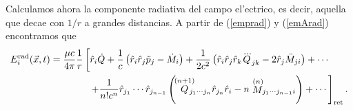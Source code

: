 Calculamos ahora la componente radiativa del campo el'ectrico, es decir, aquella que decae con $1/r$ a grandes distancias. A partir de (\ref{emprad}) y (\ref{emArad}) encontramos que
\begin{align}
E_i^{\rm rad}(\vec{x},t) &= \frac{\mu c}{4\pi}\frac{1}{r}\left[\hat{r}_i\dot{Q}+\frac{1}{c}\left(\hat{r}_i\hat{r}_j\ddot{p}_j-\dot{M}_i\right)+\frac{1}{2c^2}\left(\hat{r}_i\hat{r}_j\hat{r}_k\dddot{Q}_{jk} -2\hat{r}_j\ddot{M}_{ji}\right)+\cdots\right.\nonumber\\
& \qquad\qquad \left.+\frac{1}{n!c^n}\hat{r}_{j_1}\cdots\hat{r}_{j_{n-1}}\left(\!\stackrel{(n+1)}{Q}\!\!\!\!\!{}_{j_1\cdots j_n}\hat{r}_{j_n}\hat{r}_i- n\stackrel{(n)}{M}\!\!{}_{j_1\cdots j_{n-1}i}\right)+\cdots\right]_{\rm ret}. \label{emErad}
\end{align}

